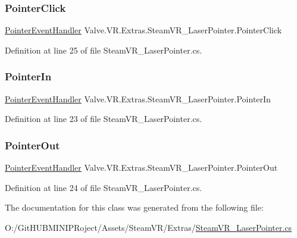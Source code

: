 \subsubsection{\texorpdfstring{PointerClick}{PointerClick}}
{\footnotesize\ttfamily \mbox{\hyperlink{namespace_valve_1_1_v_r_1_1_extras_a4f3c764399c18eb442dd4f3c4fcba807}{Pointer\+Event\+Handler}} Valve.\+V\+R.\+Extras.\+Steam\+V\+R\+\_\+\+Laser\+Pointer.\+Pointer\+Click}



Definition at line 25 of file Steam\+V\+R\+\_\+\+Laser\+Pointer.\+cs.

\mbox{\label{class_valve_1_1_v_r_1_1_extras_1_1_steam_v_r___laser_pointer_a75ac073895b82aeb20636fefdc163dfb}} 
\subsubsection{\texorpdfstring{PointerIn}{PointerIn}}
{\footnotesize\ttfamily \mbox{\hyperlink{namespace_valve_1_1_v_r_1_1_extras_a4f3c764399c18eb442dd4f3c4fcba807}{Pointer\+Event\+Handler}} Valve.\+V\+R.\+Extras.\+Steam\+V\+R\+\_\+\+Laser\+Pointer.\+Pointer\+In}



Definition at line 23 of file Steam\+V\+R\+\_\+\+Laser\+Pointer.\+cs.

\mbox{\label{class_valve_1_1_v_r_1_1_extras_1_1_steam_v_r___laser_pointer_a55b1a0df9c551fc5952be39594a5358f}} 
\subsubsection{\texorpdfstring{PointerOut}{PointerOut}}
{\footnotesize\ttfamily \mbox{\hyperlink{namespace_valve_1_1_v_r_1_1_extras_a4f3c764399c18eb442dd4f3c4fcba807}{Pointer\+Event\+Handler}} Valve.\+V\+R.\+Extras.\+Steam\+V\+R\+\_\+\+Laser\+Pointer.\+Pointer\+Out}



Definition at line 24 of file Steam\+V\+R\+\_\+\+Laser\+Pointer.\+cs.



The documentation for this class was generated from the following file\+:\begin{DoxyCompactItemize}
\item 
O\+:/\+Git\+H\+U\+B\+M\+I\+N\+I\+P\+Roject/\+Assets/\+Steam\+V\+R/\+Extras/\mbox{\hyperlink{_steam_v_r___laser_pointer_8cs}{Steam\+V\+R\+\_\+\+Laser\+Pointer.\+cs}}\end{DoxyCompactItemize}
